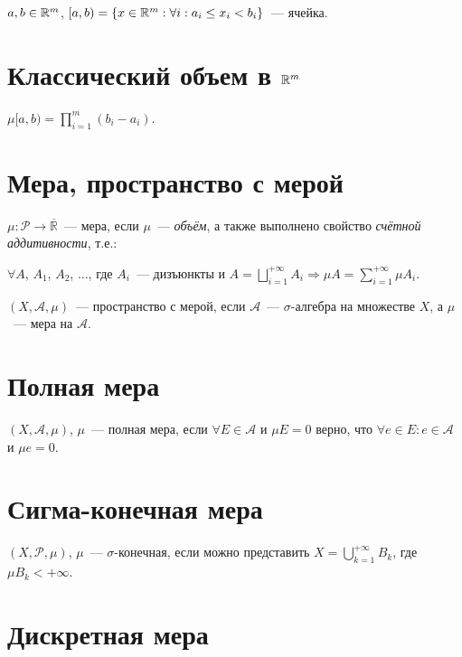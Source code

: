 \documentclass{article}
\begin{document}
        $a, b \in \mathbb{R}^m$, $[a, b) = \left\{ x \in \mathbb{R}^m : \forall i : a_i \leq x_i < b_i \right\}$~--- ячейка.
        
    \newpage
    
    \section{Классический объем в $\mathbb{R}^m$}
    
        $\mu [a, b) = \prod\limits^m_{i = 1} (b_i - a_i)$.
        
    \newpage
    
    \section{Мера, пространство с мерой}
            
        $\mu : \mathcal{P} \rightarrow \overline{\mathbb{R}}$~--- мера, если $\mu$~--- \textit{объём}, а также выполнено свойство \textit{счётной аддитивности}, т.е.:
        
        $\forall A$, $A_1$, $A_2$, $\ldots$, где $A_i$~--- дизъюнкты и $A = \bigsqcup\limits^{+\infty}_{i = 1} A_i \Rightarrow \mu A = \sum\limits^{+\infty}_{i = 1} \mu A_i$.
        
        $(X, \mathcal{A}, \mu)$~--- пространство с мерой, если $\mathcal{A}$~--- $\sigma$-алгебра на множестве $X$, а $\mu$~--- мера на $\mathcal{A}$.
        
    \newpage
    
    \section{Полная мера}
    
        $(X, \mathcal{A}, \mu)$, $\mu$~--- полная мера, если $\forall E \in \mathcal{A}$ и $\mu E = 0$ верно, что $\forall e \in E : e \in \mathcal{A}$ и $\mu e = 0$.
        
    \newpage
    
    \section{Сигма-конечная мера}
    
        $(X, \mathcal{P}, \mu)$, $\mu$~--- $\sigma$-конечная, если можно представить $X = \bigcup\limits^{+\infty}_{k = 1} B_k$, где $\mu B_k < +\infty$.
        
    \newpage
    
    \section{Дискретная мера}
    
\end{document}
